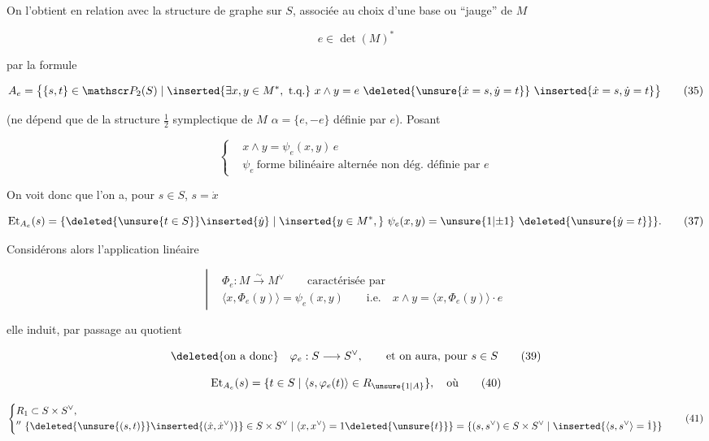 
On l'obtient en relation avec la structure de graphe  sur $S$, associée au choix d'une base  ou ``jauge'' de $M$

\[
e\in\det(M)^* \tag*{(34)}
\]

par la  formule

\[
A_e=\bigl\{\{s,t\}\in\mathscr P_2(S)\mid \inserted{\exists x,y\in M^*,\ \text{t.q.}}\ x\wedge y=e\ \deleted{\unsure{\dot x=s,\dot y=t}}\ \inserted{\dot x=s,\dot y=t}\bigr\} \tag*{(35)}
\]

(ne dépend que de la structure $\frac12$ symplectique de $M$ $\alpha=\{e,-e\}$ définie par $e$). Posant

\[
\left\{\begin{aligned}
&x\wedge y=\psi_e(x,y)\,e\\
&\psi_e\ \text{forme bilinéaire alternée non dég. définie par }e
\end{aligned}\right. \tag*{(36)}
\]

On voit donc que l'on a, pour $s\in S$, $s=\dot x$

\[
\operatorname{Et}_{A_e}(s)=
\{\deleted{\unsure{t\in S}}\inserted{\dot y}\mid\inserted{y\in M^*,}\ \psi_e(x,y)=\unsure{1|{\pm}1}\ \deleted{\unsure{\dot y=t}}\}. \tag*{(37)}
\]

Considérons alors l'application linéaire

\[
\left|\begin{aligned}
&\Phi_e:M\xrightarrow{\sim}M^\vee \qquad\text{caractérisée par}\\
&\langle x,\Phi_e(y)\rangle=\psi_e(x,y)\qquad\text{i.e.}\quad x\wedge y=\langle x,\Phi_e(y)\rangle\cdot e
\end{aligned}\right. \tag*{(38)}
\]

elle induit, par passage au quotient

\[
\deleted{\text{on a donc}}\quad \varphi_e:S\longrightarrow S^\vee,\qquad\text{et on aura, pour }s\in S \tag*{(39)}
\]

\[
\operatorname{Et}_{A_e}(s)=\{t\in S\mid\langle s,\varphi_e(t)\rangle\in R_{\unsure{1|A}}\},\quad\text{où} \tag*{(40)}
\]

\[
\left\{\begin{aligned}
&R_1\subset S\times S^\vee,\\
&\mathord{''}\ \{\deleted{\unsure{(s,t)}}\inserted{(\dot x,\dot x^\vee)}\}\in S\times S^\vee\mid \langle x,x^\vee\rangle=1\deleted{\unsure{t}}\}
=\{(s,s^\vee)\in S\times S^\vee\mid\inserted{\langle s,s^\vee\rangle=\dot 1}\}
\end{aligned}\right. \tag*{(41)}
\]


